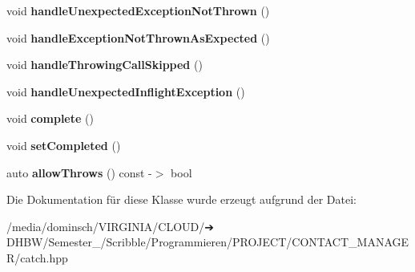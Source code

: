 \begin{DoxyCompactItemize}
void {\bfseries handle\+Unexpected\+Exception\+Not\+Thrown} ()
\item 
\mbox{\label{classCatch_1_1AssertionHandler_a51e4936e3af43b74690cedae6d2e297a}} 
void {\bfseries handle\+Exception\+Not\+Thrown\+As\+Expected} ()
\item 
\mbox{\label{classCatch_1_1AssertionHandler_a67a194d5518f307c4a16faa03a7f7442}} 
void {\bfseries handle\+Throwing\+Call\+Skipped} ()
\item 
\mbox{\label{classCatch_1_1AssertionHandler_aa2504dad6a91f3645e5f52c932c11270}} 
void {\bfseries handle\+Unexpected\+Inflight\+Exception} ()
\item 
\mbox{\label{classCatch_1_1AssertionHandler_a878a9eb828d8a1863c8dcb6575f6f40e}} 
void {\bfseries complete} ()
\item 
\mbox{\label{classCatch_1_1AssertionHandler_a6756bd5395c0ddd28764a9fb4612d5e4}} 
void {\bfseries set\+Completed} ()
\item 
\mbox{\label{classCatch_1_1AssertionHandler_a193bb3999494c46457f3059184c6b251}} 
auto {\bfseries allow\+Throws} () const -\/$>$ bool
\end{DoxyCompactItemize}


Die Dokumentation für diese Klasse wurde erzeugt aufgrund der Datei\+:\begin{DoxyCompactItemize}
\item 
/media/dominsch/\+V\+I\+R\+G\+I\+N\+I\+A/\+C\+L\+O\+U\+D/➔ D\+H\+B\+W/\+Semester\+\_/\+Scribble/\+Programmieren/\+P\+R\+O\+J\+E\+C\+T/\+C\+O\+N\+T\+A\+C\+T\+\_\+\+M\+A\+N\+A\+G\+E\+R/catch.\+hpp\end{DoxyCompactItemize}
